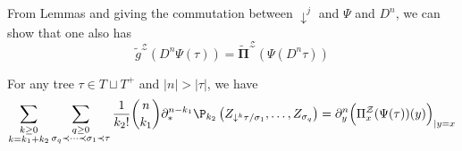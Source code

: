 \documentclass[11pt]{preprint}
\newcommand{\mcZ}{\mathcal{Z}}
\def\PPi{\boldsymbol{\Pi}}
\begin{document}
\begin{remark}\label{remark_CommutDerivPsiTau_withoutTilde}
	From Lemmas and giving the commutation between $\downarrow^j$ and $\Psi$ and $D^n$, we can show that one also has
	$$
	\widetilde{ g}^\mcZ\left(D^n \Psi(\tau)  \right) =  \widetilde{ \PPi }^\mcZ\left( \Psi(D^n\tau)  \right)
	$$
\end{remark}




\begin{proposition}\label{prop_derivetoile_Ztau_Neg}
	For any tree $\tau\in T\sqcup T^+$ and $|n|>|\tau|$, we have 
	\begin{align*}
		\sum_{\substack{k\geq 0 \\ k=k_1+k_2}} \sum_{\substack{q\geq 0 \\ \sigma_q\prec\dots\prec\sigma_1\prec \tau }} \frac{1}{k_2!} \binom{n}{k_1}  \partial^{n-k_1}_*\P_{k_2}\left(  Z_{\downarrow^k\tau/\sigma_1},\dots, Z_{\sigma_q}   \right) = \partial^n_y\Big(\Pi_x^\mcZ(\Psi(\tau))(y)\Big)_{|y=x}
	\end{align*}
\end{proposition}
\end{document}
